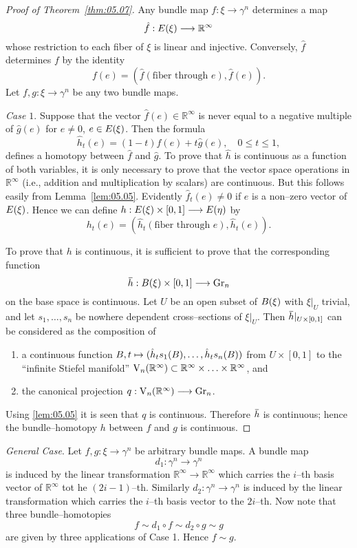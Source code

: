 \documentclass[../main]{subfiles}
\begin{document}
\begin{proof}[Proof of Theorem~\ref{thm:05.07}]
Any bundle map $f : \xi \longrightarrow \gamma^n$ determines a map \[\hat f : E(\xi) \longrightarrow {\mathbb R}^\infty\] whose restriction to each fiber of $\xi$ is linear and injective. Conversely, $\hat f$ determines $f$ by the identity \[f(e) = ({\hat f}(\text{fiber through } e), {\hat f}(e)).\] Let $f, g : \xi \longrightarrow \gamma^n$ be any two bundle maps. 

\emph{Case $1$}. Suppose that the vector ${\hat f}(e) \in {\mathbb R}^\infty$ is never equal to a negative multiple of ${\hat g}(e)$ for $e \ne 0$, $e \in E(\xi)$. Then the formula \[{\hat h}_t(e) = (1 - t) {\hat f}(e) + t {\hat g}(e), \quad 0 \le t \le 1,\] defines a homotopy between ${\hat f}$ and ${\hat g}$. To prove that $\hat h$ is continuous as a function of both variables, it is only necessary to prove that the vector space operations in ${\mathbb R}^\infty$ (i.e., addition and multiplication by scalars) are continuous. But this follows easily from Lemma~\ref{lem:05.05}. Evidently ${\hat f}_t(e) \ne 0$ if $e$ is a non--zero vector of $E(\xi)$. Hence we can define $h : E(\xi) \times [0, 1] \longrightarrow E(\eta)$ by \[h_t(e) = ({\hat h}_t(\text{fiber through } e), {\hat h}_t(e)).\] 

To prove that $h$ is continuous, it is sufficient to prove that the corresponding function \[\xoverline h : \base(\xi) \times [0, 1] \longrightarrow \grassmannian_n\] on the base space is continuous. Let $U$ be an open subset of $B(\xi)$ with $\xi |_U$ trivial, and let $s_1, \ldots, s_n$ be nowhere dependent cross--sections of $\xi |_U$. Then $\xoverline h |_{U \times [0,1]}$ can be considered as the composition of
\begin{enumerate}[label=\arabic*)]
    \item a continuous function $B, t \mapsto ({\hat h}_t s_1(B), \ldots, {\hat h}_t s_n(B))$ from $U \times [0, 1]$ to the ``infinite Stiefel manifold'' $\operatorname{V}_n({\mathbb R}^\infty) \subset {\mathbb R}^\infty \times \ldots \times {\mathbb R}^\infty$, and
    \item the canonical projection $q : \operatorname{V}_n({\mathbb R}^\infty) \longrightarrow \operatorname{Gr}_n$.
\end{enumerate} 
Using \ref{lem:05.05} it is seen that $q$ is continuous. Therefore $\xoverline h$ is continuous; hence the bundle--homotopy $h$ between $f$ and $g$ is continuous. 
\end{proof}

\emph{General Case}. Let $f, g : \xi \longrightarrow \gamma^n$ be arbitrary bundle maps. A bundle map \[d_1 : \gamma^n \longrightarrow \gamma^n\] is induced by the linear transformation ${\mathbb R}^\infty \longrightarrow {\mathbb R}^\infty$ which carries the $i$--th basis vector of ${\mathbb R}^\infty$ tot he $(2 i - 1)$--th. Similarly $d_2 : \gamma^n \longrightarrow \gamma^n$ is induced by the linear transformation which carries the $i$--th basis vector to the $2i$--th. Now note that three bundle--homotopies \[f \sim d_1 \circ f \sim d_2 \circ g \sim g\] are given by three applications of Case 1. Hence $f \sim g$. 
\end{document}
